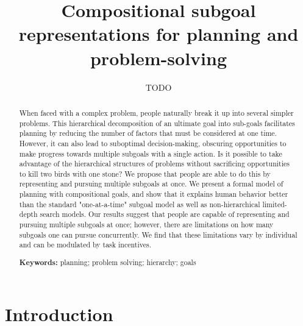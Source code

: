 \documentclass[10pt,letterpaper]{article}
\title{Compositional subgoal representations for planning and problem-solving}
\author{TODO}
\begin{document}
\maketitle


\begin{abstract}
When faced with a complex problem, people naturally break it up into several simpler problems. This hierarchical decomposition of an ultimate goal into sub-goals facilitates planning by reducing the number of factors that must be considered at one time. However, it can also lead to suboptimal decision-making, obscuring opportunities to make progress towards multiple subgoals with a single action.
Is it possible to take advantage of the hierarchical structures of problems without sacrificing opportunities to kill two birds with one stone?
We propose that people are able to do this by representing and pursuing multiple subgoals at once. We present a formal model of planning with compositional goals, and show that it explains human behavior better than the standard "one-at-a-time" subgoal model as well as non-hierarchical limited-depth search models.
Our results suggest that people are capable of representing and pursuing multiple subgoals at once; however, there are limitations on how many subgoals one can pursue concurrently. We find that these limitations vary by individual and can be modulated by task incentives.

\textbf{Keywords:} 
planning; problem solving; hierarchy; goals
\end{abstract}


\section{Introduction}
\end{document}
